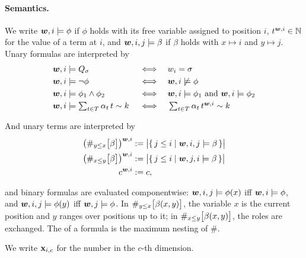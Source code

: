 \paragraph{Semantics.}
We write ${{\boldsymbol{w}}},i\models\phi$ if $\phi$ holds with its free variable assigned to position $i$,
$t^{{{\boldsymbol{w}}},i}\in{{ \mathbb{N}}}$ for the value of a term at $i$, and
${{\boldsymbol{w}}},i,j\models\beta$ if $\beta$ holds with $x\mapsto i$ and $y\mapsto j$. Unary formulas are interpreted by
\begin{align*}
    {{\boldsymbol{w}}},i&\models Q_\sigma &&\iff && w_i=\sigma\\
    {{\boldsymbol{w}}},i&\models \lnot \phi &&\iff && {{\boldsymbol{w}}},i\not\models \phi\\
    {{\boldsymbol{w}}},i&\models \phi_1\land \phi_2 &&\iff && {{\boldsymbol{w}}},i\models \phi_1 \text{ and } {{\boldsymbol{w}}},i\models \phi_2\\
    {{\boldsymbol{w}}},i&\models \textstyle\sum_{t\in T}\alpha_t\, t\sim k &&\iff && \textstyle\sum_{t\in T}\alpha_t\, t^{{{\boldsymbol{w}}},i}\sim k\\[4pt]
\end{align*}
And unary terms are interpreted by 
\begin{align*}
    \bigl(\#_{y\leq x}\bigl[\beta\bigr]\bigr)^{{{\boldsymbol{w}}},i} &:= \bigl|\{\,j\leq i \mid {{\boldsymbol{w}}},i,j\models\beta\,\}\bigr| \\
    \bigl(\#_{x\leq y}\bigl[\beta\bigr]\bigr)^{{{\boldsymbol{w}}},i} &:= \bigl|\{\,j\leq i \mid {{\boldsymbol{w}}},j,i\models\beta\,\}\bigr| \\
    c^{{{\boldsymbol{w}}},i} &:= c,
\end{align*}


and binary formulas are evaluated componentwise:
${{\boldsymbol{w}}},i,j\models\phi(x)$ iff ${{\boldsymbol{w}}},i\models\phi$, and ${{\boldsymbol{w}}},i,j\models\phi(y)$ iff ${{\boldsymbol{w}}},j\models\phi$.
In $\#_{y\leq x}\bigl[\beta(x,y)\bigr]$, the variable $x$ is the current position and $y$ ranges over positions up to it;
in $\#_{x\leq y}\bigl[\beta(x,y)\bigr]$, the roles are exchanged.
The  of a formula is the maximum nesting of $\#$.

We write $\mathbf{x}_{i,c}$ for the number in the $c$-th dimension.

